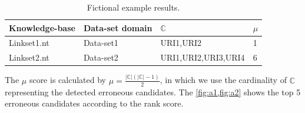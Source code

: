 \begin{table}[H]
	\centering
	\caption{Fictional example results.}
	\label{tab:tuples}
	\begin{tabular}{@{}llll@{}}
		\toprule
		Knowledge-base & Data-set domain & \textbf{$\mathbb{C}$} & $\mu$ \\ \midrule
		Linkset1.nt                 & Data-set1         & URI1,URI2               & 1              \\
		Linkset2.nt                 & Data-set2         & {\small URI1,URI2,URI3,URI4}     & 6              \\ \bottomrule
	\end{tabular}
\end{table}
%
The $\mu$ score is calculated by $\mu = \frac{|\mathbb{C}|(|\mathbb{C}| - 1)}{2}$, in which we use the cardinality of $\mathbb{C}$ representing the detected erroneous candidates. The \cref{fig:a1,fig:a2} shows the top 5 erroneous candidates according to the rank score.

\newcommand{\slice}[4]{
  \pgfmathparse{0.5*#1+0.5*#2}
  \let\midangle\pgfmathresult

  \draw[thick,fill=black!10] (0,0) -- (#1:1) arc (#1:#2:1) -- cycle;

  \node[label=\midangle:#4] at (\midangle:1) {};

  \pgfmathparse{min((#2-#1-10)/110*(-0.3),0)}
  \let\temp\pgfmathresult
  \pgfmathparse{max(\temp,-0.5) + 0.8}
  \let\innerpos\pgfmathresult
  \node at (\midangle:\innerpos) {#3};
}

